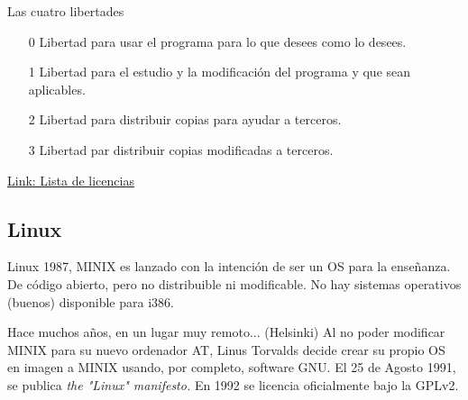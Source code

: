 \documentclass[12pt]{beamer}
\begin{document}
\begin{frame}{Las cuatro libertades}
	\begin{itemize}
		\item[0] Libertad para usar el programa para lo que desees como lo desees.
		\item[1] Libertad para el estudio y la modificación del programa y que sean aplicables.
		\item[2] Libertad para distribuir copias para ayudar a terceros.
		\item[3] Libertad par distribuir copias modificadas a terceros.
	\end{itemize}
\vfill
{}
\vfill
\href{https://www.gnu.org/licenses/license-list.html}{Link: Lista de licencias}
\end{frame}

\subsection{Linux}
\begin{frame}{Linux}
	1987, MINIX es lanzado con la intención de ser un OS para la enseñanza. De código abierto, pero no distribuible ni modificable. No hay sistemas operativos (buenos) disponible para i386.
	\begin{block}{Hace muchos años, en un lugar muy remoto... (Helsinki)}
	Al no poder modificar MINIX para su nuevo ordenador AT, Linus Torvalds decide crear su propio OS en imagen a MINIX usando, por completo, software GNU. El 25 de Agosto 1991, se publica \textit{the "Linux" manifesto.} En 1992 se licencia oficialmente bajo la GPLv2.
	\end{block}
\end{frame}
\end{document}
